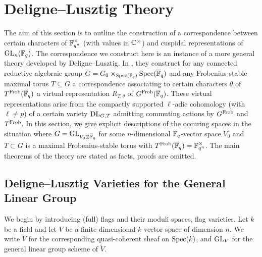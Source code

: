 \documentclass[../main.tex]{subfiles}
\begin{document}
\section{Deligne--Lusztig Theory} 
\label{sec:Deligne--Lusztig Theory} 

\label{sub:Deligne-Lusztig Theory for Depth Zero Representations}
The aim of this section is to outline the construction of a correspondence
between certain characters of $\mathbb{F}_{q^n}^\times$ (with values in $\mathbb{C}^\times$) and 
cuspidal representations of $\operatorname{GL}_n(\mathbb{F}_q)$. The correspondence we construct here
is an instance of a more general theory developed by Deligne--Lusztig. 
In \cite{delignelusztig1976}, they construct
for any connected reductive algebraic group $G = G_0 \times_{\operatorname{Spec}(\mathbb{F}_q)}
\operatorname{Spec}(\overline {\mathbb{F}}_q)$ and any
Frobenius-stable maximal torus $T \subseteq G$ a correspondence associating to
certain characters $\theta$ of $T^{\mathrm{Frob}}({\overline {\mathbb{F}}_q})$ a virtual representation $R_{T,\theta}$ of 
$G^{\mathrm{Frob}}({\overline {\mathbb{F}}_q})$. These virtual representations arise from the compactly supported
$\ell$-adic cohomology (with $\ell \neq p$) of a certain variety $\mathrm{DL}_{G,T}$
admitting commuting actions by $G^{\mathrm{Frob}}$ and $T^{\mathrm{Frob}}$. 
In this section, we give explicit descriptions of the occuring spaces 
in the situation where $G = \operatorname{GL}_{V_0 \otimes \overline {\mathbb{F}}_q}$ for some
$n$-dimensional $\mathbb{F}_q$-vector space $V_0$ and $T \subset G$ is a maximal 
Frobenius-stable torus with $T^{\mathrm{Frob}}(\overline {\mathbb{F}}_q) = \mathbb{F}_{q^n}^\times$.
The main theorems of the theory are stated as facts, proofs are omitted.

\subsection{Deligne--Lusztig Varieties for the General Linear Group} %
\label{ssub:Deligne--Lusztig Varieties}
We begin by introducing (full) flags and their moduli spaces, flag
varieties. Let $k$ be a field and let $V$ be a finite dimensional $k$-vector space
of dimension $n$. We write $\tilde V$ for the corresponding quasi-coherent sheaf
on $\operatorname{Spec}(k)$, and $\operatorname{GL}_V$ for the general linear group scheme of $\tilde V$.
\end{document}

